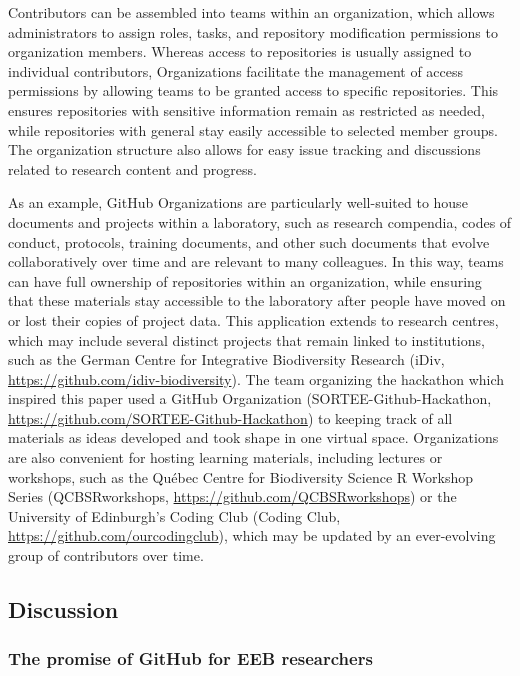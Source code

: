 Contributors can be assembled into teams within an organization, which allows administrators to assign roles, tasks, and repository modification permissions to organization members.
Whereas access to repositories is usually assigned to individual contributors, Organizations facilitate the management of access permissions by allowing teams to be granted access to specific repositories.
This ensures repositories with sensitive information remain as restricted as needed, while repositories with general stay easily accessible to selected member groups.
The organization structure also allows for easy issue tracking and discussions related to research content and progress.

As an example, GitHub Organizations are particularly well-suited to house documents and projects within a laboratory, such as research compendia, codes of conduct, protocols, training documents, and other such documents that evolve collaboratively over time and are relevant to many colleagues.
In this way, teams can have full ownership of repositories within an organization, while ensuring that these materials stay accessible to the laboratory after people have moved on or lost their copies of project data.
This application extends to research centres, which may include several distinct projects that remain linked to institutions, such as the German Centre for Integrative Biodiversity Research (iDiv, \url{https://github.com/idiv-biodiversity}).
The team organizing the hackathon which inspired this paper used a GitHub Organization (SORTEE-Github-Hackathon, \url{https://github.com/SORTEE-Github-Hackathon}) to keeping track of all materials as ideas developed and took shape in one virtual space.
Organizations are also convenient for hosting learning materials, including lectures or workshops, such as the Québec Centre for Biodiversity Science R Workshop Series (QCBSRworkshops, \url{https://github.com/QCBSRworkshops}) or the University of Edinburgh's Coding Club (Coding Club, \url{https://github.com/ourcodingclub}), which may be updated by an ever-evolving group of contributors over time.

\hypertarget{discussion}{%
\subsection{Discussion}\label{discussion}}

\hypertarget{the-promise-of-github-for-eeb-researchers}{%
\subsubsection{The promise of GitHub for EEB researchers}\label{the-promise-of-github-for-eeb-researchers}}

